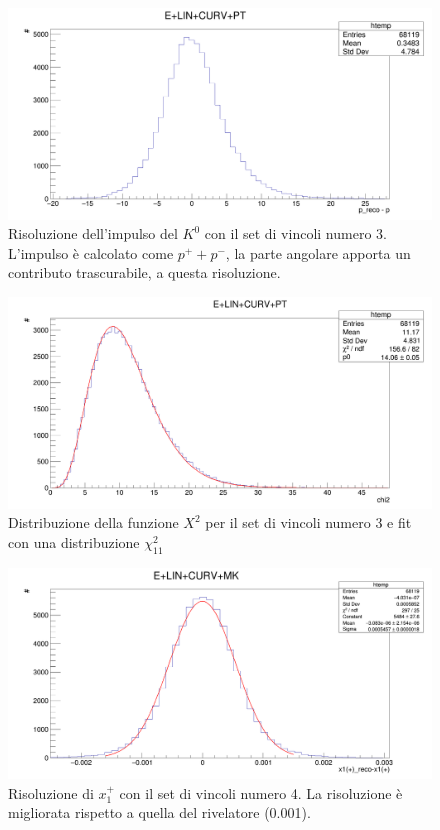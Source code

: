 \documentclass[8pt]{extarticle}
\begin{document}
\begin{figure}[h!]
	\begin{center}
		\includegraphics[scale=0.25]{set_3_p} 
		\caption{Risoluzione dell'impulso del $K^0$ con il set di vincoli numero 3. L'impulso è calcolato come $p^+ + p^-$, la parte angolare apporta un contributo trascurabile, a questa risoluzione.}
		\label{fig:set_3_p}
	\end{center}
\end{figure}

\begin{figure}[h!]
	\begin{center}
		\includegraphics[scale=0.25]{set_3_chi2} 
		\caption{Distribuzione della funzione $X^2$ per il set di vincoli numero 3 e fit con una distribuzione $\chi^2_{11}$}
		\label{fig:set_3_chi2}
	\end{center}
\end{figure}

\begin{figure}[h!]
	\begin{center}
		\includegraphics[scale=0.25]{set_4_x} 
		\caption{Risoluzione di $x_1^+$ con il set di vincoli numero 4. La risoluzione è migliorata rispetto a quella del rivelatore (0.001).}
		\label{fig:set_4_x}
	\end{center}
\end{figure}
\end{document}
